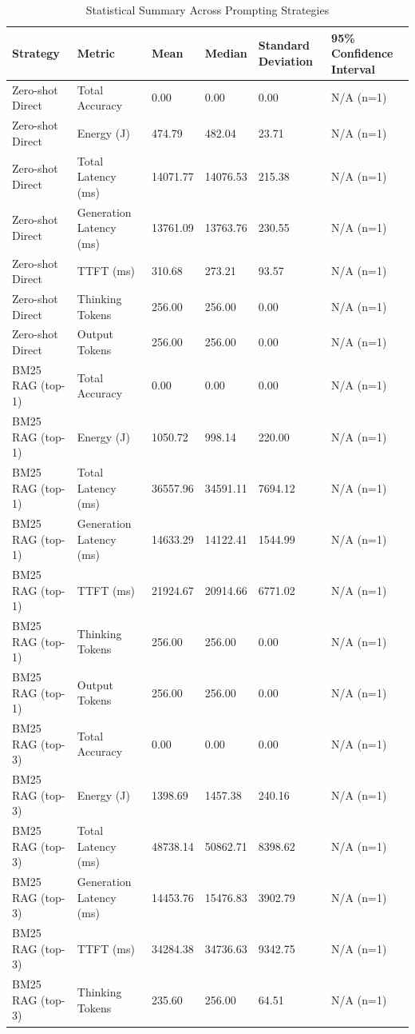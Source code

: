 \begin{table}
\caption{Statistical Summary Across Prompting Strategies}
\label{tab:statistical_summary}
\begin{tabular}{llllll}
\toprule
Strategy & Metric & Mean & Median & Standard Deviation & 95\% Confidence Interval \\
\midrule
Zero-shot Direct & Total Accuracy & 0.00 & 0.00 & 0.00 & N/A (n=1) \\
Zero-shot Direct & Energy (J) & 474.79 & 482.04 & 23.71 & N/A (n=1) \\
Zero-shot Direct & Total Latency (ms) & 14071.77 & 14076.53 & 215.38 & N/A (n=1) \\
Zero-shot Direct & Generation Latency (ms) & 13761.09 & 13763.76 & 230.55 & N/A (n=1) \\
Zero-shot Direct & TTFT (ms) & 310.68 & 273.21 & 93.57 & N/A (n=1) \\
Zero-shot Direct & Thinking Tokens & 256.00 & 256.00 & 0.00 & N/A (n=1) \\
Zero-shot Direct & Output Tokens & 256.00 & 256.00 & 0.00 & N/A (n=1) \\
BM25 RAG (top-1) & Total Accuracy & 0.00 & 0.00 & 0.00 & N/A (n=1) \\
BM25 RAG (top-1) & Energy (J) & 1050.72 & 998.14 & 220.00 & N/A (n=1) \\
BM25 RAG (top-1) & Total Latency (ms) & 36557.96 & 34591.11 & 7694.12 & N/A (n=1) \\
BM25 RAG (top-1) & Generation Latency (ms) & 14633.29 & 14122.41 & 1544.99 & N/A (n=1) \\
BM25 RAG (top-1) & TTFT (ms) & 21924.67 & 20914.66 & 6771.02 & N/A (n=1) \\
BM25 RAG (top-1) & Thinking Tokens & 256.00 & 256.00 & 0.00 & N/A (n=1) \\
BM25 RAG (top-1) & Output Tokens & 256.00 & 256.00 & 0.00 & N/A (n=1) \\
BM25 RAG (top-3) & Total Accuracy & 0.00 & 0.00 & 0.00 & N/A (n=1) \\
BM25 RAG (top-3) & Energy (J) & 1398.69 & 1457.38 & 240.16 & N/A (n=1) \\
BM25 RAG (top-3) & Total Latency (ms) & 48738.14 & 50862.71 & 8398.62 & N/A (n=1) \\
BM25 RAG (top-3) & Generation Latency (ms) & 14453.76 & 15476.83 & 3902.79 & N/A (n=1) \\
BM25 RAG (top-3) & TTFT (ms) & 34284.38 & 34736.63 & 9342.75 & N/A (n=1) \\
BM25 RAG (top-3) & Thinking Tokens & 235.60 & 256.00 & 64.51 & N/A (n=1) \\

\end{tabular}
\end{table}

